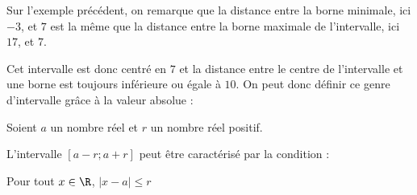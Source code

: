 \medskip
Sur l'exemple précédent, on remarque que la distance entre la borne minimale, ici $-3$, et $7$ est la même que la distance entre la borne maximale de l'intervalle, ici $17$, et $7$.

\noindent Cet intervalle est donc centré en $7$ et la distance entre le centre de l'intervalle et une borne est toujours inférieure ou égale à $10$. On peut donc définir ce genre d'intervalle grâce à la valeur absolue :

\begin{prop}{}{}
Soient $a$ un nombre réel et $r$ un nombre réel positif.

\noindent L'intervalle \quad $[a-r;a+r]$ \quad peut être caractérisé par la condition :  \begin{center}
Pour tout $x \in \R$, $|x-a| \leqslant r$
\end{center}
\end{prop}